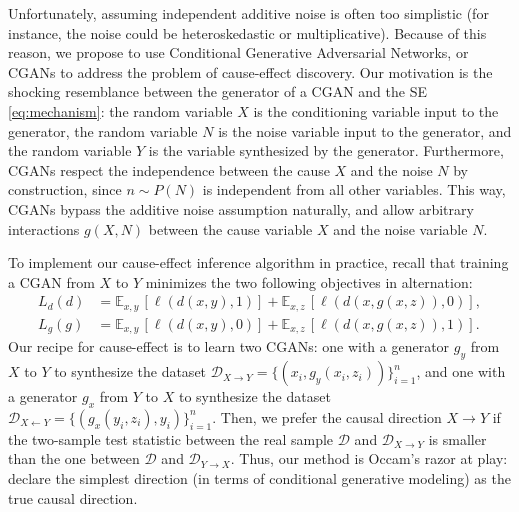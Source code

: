 \documentclass[a4paper]{article}
\begin{document}
  Unfortunately, assuming independent additive noise is often too simplistic
  (for instance, the noise could be heteroskedastic or multiplicative).
  Because of this reason, we propose to use Conditional Generative Adversarial
  Networks, or CGANs \citep{conditionalGans} to address the problem of
  cause-effect discovery. Our motivation is the shocking resemblance between
  the generator
  of a CGAN and the
  SE \eqref{eq:mechanism}: the random variable $X$ is the
  conditioning variable
  input to the generator, the random variable $N$ is the noise variable input
  to the generator, and the random variable $Y$ is the variable synthesized by
  the generator. Furthermore, CGANs respect the independence between the cause
  $X$ and the noise $N$ by construction, since $n \sim P(N)$ is independent
  from all other variables.  This way, CGANs bypass the additive noise
  assumption naturally, and allow arbitrary interactions $g(X,N)$
  between the cause variable $X$ and the noise variable $N$.

  To implement our cause-effect inference algorithm in practice,
  recall that training a CGAN from $X$ to $Y$ minimizes the two
  following objectives in alternation:
  \begin{align}
    L_d(d) &= \mathbb{E}_{x,y}\, \left[\ell(d(x,y), 1)\right] + \mathbb{E}_{x,z}\, \left[\ell(d(x,g(x,z)), 0)\right],\nonumber\\
    L_g(g) &= \mathbb{E}_{x,y}\, \left[\ell(d(x,y), 0)\right] + \mathbb{E}_{x,z}\, \left[\ell(d(x,g(x,z)),1)\right].\nonumber
  \end{align}
  Our recipe for cause-effect is to learn two CGANs: one with a
  generator $g_y$ from $X$ to $Y$ to synthesize the dataset $\mathcal{D}_{X\to
  Y} = \{(x_i, g_y(x_i,z_i))\}_{i=1}^n$, and one with a generator $g_x$ from $Y$
  to $X$ to synthesize the dataset $\mathcal{D}_{X\leftarrow Y} =
  \{(g_x(y_i,z_i),y_i)\}_{i=1}^n$. Then, we prefer the causal direction
  $X \to Y$ if the two-sample test statistic between the real sample
  $\mathcal{D}$ and $\mathcal{D}_{X\to Y}$ is smaller than the one
  between $\mathcal{D}$ and $\mathcal{D}_{Y \to X}$. Thus, our method is
  Occam's razor at play: declare the simplest direction (in terms of
  conditional generative modeling) as the true causal direction.
\end{document}
